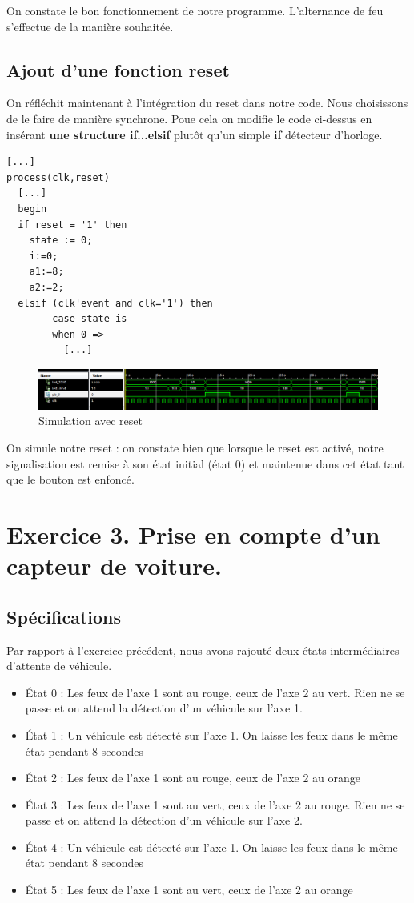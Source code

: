 On constate le bon fonctionnement de notre programme. L'alternance de feu s'effectue de la manière souhaitée.

\subsection{Ajout d'une fonction reset}

On réfléchit maintenant à l'intégration du reset dans notre code. Nous choisissons de le faire de manière synchrone.
Poue cela on modifie le code ci-dessus en insérant \textbf{une structure if...elsif} plutôt qu'un simple \textbf{if} détecteur d'horloge.

\vhdl
\begin{lstlisting}
[...]
process(clk,reset)
  [...]
  begin
  if reset = '1' then
  	state := 0;
  	i:=0;
  	a1:=8;
  	a2:=2;
  elsif (clk'event and clk='1') then
  		case state is
  		when 0 =>
  		  [...]
\end{lstlisting}

\begin{figure}[!h]
   \centering\includegraphics[width=1.0\textwidth]{files/tp3_2/simu_reset.png}
   \caption{Simulation avec reset}
\end{figure}

On simule notre reset : on constate bien que lorsque le reset est activé, notre signalisation est remise à son état initial (état 0) et maintenue dans cet état tant que le bouton est enfoncé.

\section{Exercice 3. Prise en compte d’un capteur de voiture.}
\subsection{Spécifications}
Par rapport à l'exercice précédent, nous avons rajouté deux états intermédiaires d'attente de véhicule.
\begin{itemize}
  \item État 0 : Les feux de l'axe 1 sont au rouge, ceux de l'axe 2 au vert. Rien ne se passe et on attend la détection d'un véhicule sur l'axe 1.
  \item État 1 : Un véhicule est détecté sur l'axe 1. On laisse les feux dans le même état pendant 8 secondes
  \item État 2 : Les feux de l'axe 1 sont au rouge, ceux de l'axe 2 au orange
  \item État 3 : Les feux de l'axe 1 sont au vert, ceux de l'axe 2 au rouge. Rien ne se passe et on attend la détection d'un véhicule sur l'axe 2.
  \item État 4 : Un véhicule est détecté sur l'axe 1. On laisse les feux dans le même état pendant 8 secondes
  \item État 5 : Les feux de l'axe 1 sont au vert, ceux de l'axe 2 au orange
\end{itemize}

